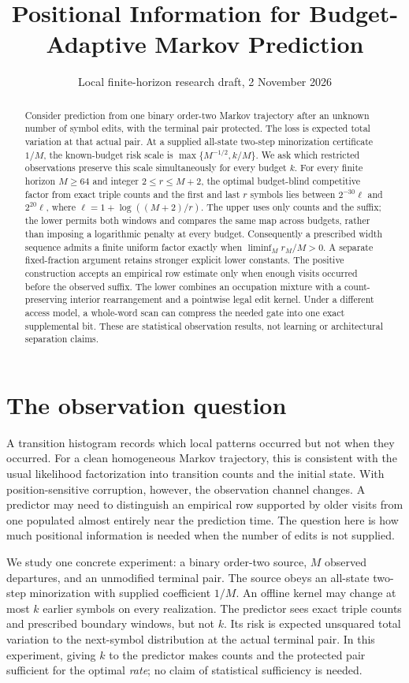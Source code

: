 \documentclass[11pt,letterpaper]{article}
\title{Positional Information for Budget-Adaptive Markov Prediction}
\author{}
\date{Local finite-horizon research draft, 2 November 2026}
\theoremstyle{definition}
\theoremstyle{remark}
\numberwithin{equation}{section}
\begin{document}
\maketitle
\begin{abstract}
Consider prediction from one binary order-two Markov trajectory after an unknown number of symbol edits, with the terminal pair protected. The loss is expected total variation at that actual pair. At a supplied all-state two-step minorization certificate $1/M$, the known-budget risk scale is $\max\{M^{-1/2},k/M\}$. We ask which restricted observations preserve this scale simultaneously for every budget $k$. For every finite horizon $M\ge64$ and integer $2\le r\le M+2$, the optimal budget-blind competitive factor from exact triple counts and the first and last $r$ symbols lies between $2^{-30}\ell$ and $2^{20}\ell$, where $\ell=1+\log((M+2)/r)$. The upper uses only counts and the suffix; the lower permits both windows and compares the same map across budgets, rather than imposing a logarithmic penalty at every budget. Consequently a prescribed width sequence admits a finite uniform factor exactly when $\liminf_M r_M/M>0$. A separate fixed-fraction argument retains stronger explicit lower constants. The positive construction accepts an empirical row estimate only when enough visits occurred before the observed suffix. The lower combines an occupation mixture with a count-preserving interior rearrangement and a pointwise legal edit kernel. Under a different access model, a whole-word scan can compress the needed gate into one exact supplemental bit. These are statistical observation results, not learning or architectural separation claims.
\end{abstract}

\section{The observation question}
A transition histogram records which local patterns occurred but not when they occurred. For a clean homogeneous Markov trajectory, this is consistent with the usual likelihood factorization into transition counts and the initial state. With position-sensitive corruption, however, the observation channel changes. A predictor may need to distinguish an empirical row supported by older visits from one populated almost entirely near the prediction time. The question here is how much positional information is needed when the number of edits is not supplied.

We study one concrete experiment: a binary order-two source, $M$ observed departures, and an unmodified terminal pair. The source obeys an all-state two-step minorization with supplied coefficient $1/M$. An offline kernel may change at most $k$ earlier symbols on every realization. The predictor sees exact triple counts and prescribed boundary windows, but not $k$. Its risk is expected unsquared total variation to the next-symbol distribution at the actual terminal pair. In this experiment, giving $k$ to the predictor makes counts and the protected pair sufficient for the optimal \emph{rate}; no claim of statistical sufficiency is needed.
\end{document}
